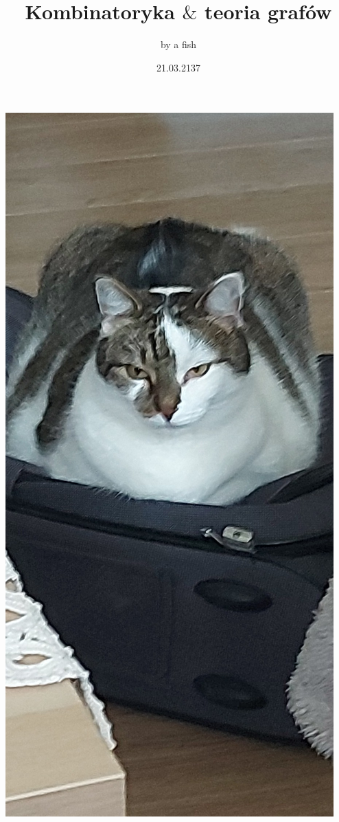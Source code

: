 \documentclass{article}[13pt]
\title {Kombinatoryka $\&$ teoria grafów}
\author{by a fish}
\date {21.03.2137}
\begin{document}
\maketitle

\newpage

\begin{center}
    \includegraphics[height=\textheight]{potega.jpg}
\end{center}
\end{document}
